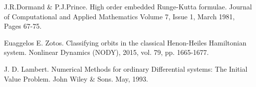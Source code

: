 \begin{thebibliography}{99}
     J.R.Dormand \& P.J.Prince. High order embedded Runge-Kutta formulae. Journal of Computational and Applied Mathematics
    Volume 7, Issue 1, March 1981, Pages 67-75.
    

      Euaggelos E. Zotos. Classifying orbits in the classical Henon-Heiles Hamiltonian system. Nonlinear Dynamics (NODY), 2015, vol. 79, pp. 1665-1677. 
     
%    
    
     J. D. Lambert. Numerical Methods for ordinary Differential systems: The Initial Value Problem. John Wiley \& Sons. May, 1993.
    
    
    
\end{thebibliography}
